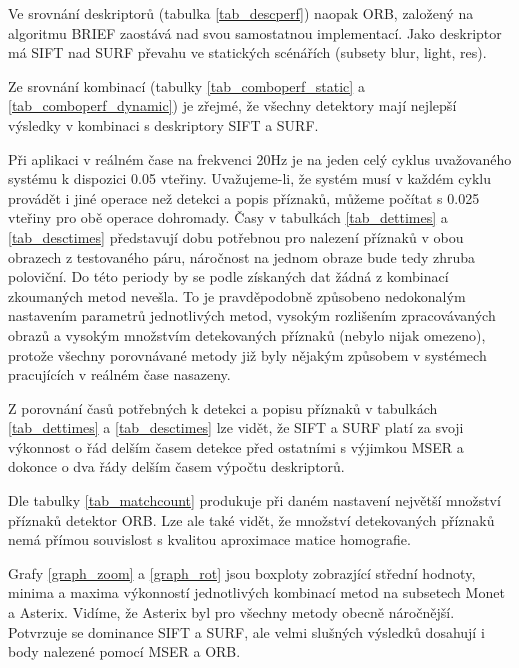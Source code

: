 

Ve srovnání deskriptorů (tabulka \ref{tab_descperf}) naopak ORB, založený na algoritmu BRIEF zaostává nad svou samostatnou implementací. Jako deskriptor má SIFT nad SURF převahu ve statických scénářích (subsety blur, light, res).



Ze srovnání kombinací (tabulky \ref{tab_comboperf_static} a \ref{tab_comboperf_dynamic}) je zřejmé, že všechny detektory mají nejlepší výsledky v kombinaci s deskriptory SIFT a SURF.



Při aplikaci v reálném čase na frekvenci 20Hz je na jeden celý cyklus uvažovaného systému k dispozici 0.05 vteřiny. Uvažujeme-li, že systém musí v každém cyklu provádět i jiné operace než detekci a popis příznaků, můžeme počítat s 0.025 vteřiny pro obě operace dohromady. Časy v tabulkách \ref{tab_dettimes} a \ref{tab_desctimes} představují dobu potřebnou pro nalezení příznaků v obou obrazech z testovaného páru, náročnost na jednom obraze bude tedy zhruba poloviční. Do této periody by se podle získaných dat žádná z kombinací zkoumaných metod nevešla. To je pravděpodobně způsobeno nedokonalým nastavením parametrů jednotlivých metod, vysokým rozlišením zpracovávaných obrazů a vysokým množstvím detekovaných příznaků (nebylo nijak omezeno), protože všechny porovnávané metody již byly nějakým způsobem v systémech pracujících v reálném čase nasazeny.

Z porovnání časů potřebných k detekci a popisu příznaků v tabulkách \ref{tab_dettimes} a \ref{tab_desctimes} lze vidět, že SIFT a SURF platí za svoji výkonnost o řád delším časem detekce před ostatními s výjimkou MSER a dokonce o dva řády delším časem výpočtu deskriptorů.



Dle tabulky \ref{tab_matchcount} produkuje při daném nastavení největší množství příznaků detektor ORB. Lze ale také vidět, že množství detekovaných příznaků nemá přímou souvislost s kvalitou aproximace matice homografie.



Grafy \ref{graph_zoom} a \ref{graph_rot} jsou boxploty zobrazjící střední hodnoty, minima a maxima výkonností jednotlivých kombinací metod na subsetech Monet a Asterix. Vidíme, že Asterix byl pro všechny metody obecně náročnější. Potvrzuje se dominance SIFT a SURF, ale velmi slušných výsledků dosahují i body nalezené pomocí MSER a ORB.


